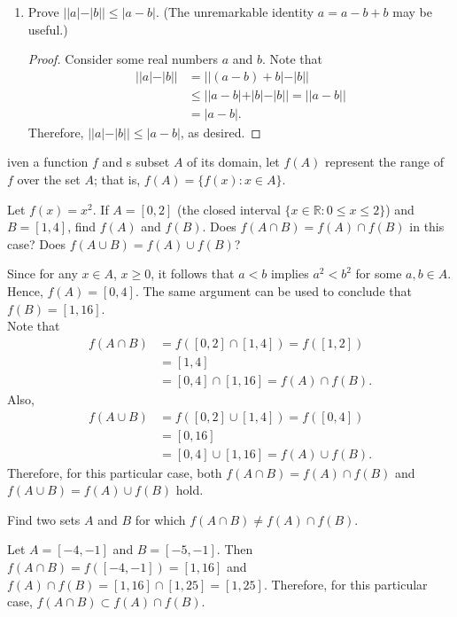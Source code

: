 \documentclass[12pt]{article}
\newcommand{\R}{\mathbb{R}}
\newenvironment{problem}[2][Problem]{\begin{trivlist}
		\item[\hskip \labelsep {\bfseries #1}\hskip \labelsep {\bfseries #2.}]}{\end{trivlist}}
\newenvironment{solution}[2][Solution]{\begin{trivlist}
		\item[\hskip \labelsep {\bfseries #1}\hskip \labelsep {\bfseries #2.}]}{\end{trivlist}}
\begin{document}
\begin{problem}{1.2.6}
\begin{enumerate}[label=(\alph*)]
			\item Prove $||a|-|b||\leq |a-b|$. (The unremarkable identity $a=a-b+b$ may be useful.)
			\begin{proof}
				Consider some real numbers $a$ and $b$. Note that
				\begin{align*}
					||a|-|b|| &= ||(a-b)+b|-|b||\\
					&\leq ||a-b|+|b|-|b|| = ||a-b||\\
					&= |a-b|.
				\end{align*}
			Therefore, $||a|-|b|| \leq |a-b|$, as desired. 
			\end{proof}
 		\end{enumerate}
	\end{problem}

	\begin{problem}
		Given a function $f$ and s subset $A$ of its domain, let $f(A)$ represent the range of $f$ over the set $A$; that is, $f(A) = \{f(x):x\in A\}$.
		\begin{enumerate}[label=(\alph*)]
			\item Let $f(x) = x^{2}$. If $A=[0,2]$ (the closed interval $\{x\in \R:0\leq x \leq 2\}$) and $B=[1,4]$, find $f(A)$ and $f(B)$. Does $f(A\cap B) = f(A) \cap f(B)$ in this case? Does $f(A\cup B) = f(A)\cup f(B)$?
			\begin{solution}{(a)}
				Since for any $x\in A$, $x\geq 0$, it follows that $a<b$ implies $a^{2}<b^{2}$ for some $a,b \in A$. Hence, $f(A) = [0,4]$. The same argument can be used to conclude that $f(B) = [1,16]$. \\
				
				Note that 
				\begin{align*}
					f(A\cap B) &= f([0,2]\cap [1,4]) = f([1,2])\\
					&= [1,4]\\
					&= [0,4]\cap [1,16] = f(A)\cap f(B).
				\end{align*}
			 Also,
			\begin{align*}
				f(A\cup B) &= f([0,2]\cup [1,4]) = f([0,4])\\
				&= [0,16]\\
				&= [0,4]\cup [1,16] = f(A)\cup f(B).
			\end{align*}
		Therefore, for this particular case, both $f(A\cap B) = f(A)\cap f(B)$ and $f(A\cup B) = f(A)\cup f(B)$ hold.
			\end{solution}
		
		\item Find two sets $A$ and $B$ for which $f(A\cap B) \neq f(A)\cap f(B)$.
		\begin{solution}{b}
			Let $A=[-4,-1]$ and $B=[-5,-1]$. Then $f(A\cap B) = f([-4,-1]) = [1,16]$ and $f(A)\cap f(B) = [1,16]\cap [1,25] = [1,25]$. Therefore, for this particular case, $f(A\cap B) \subset f(A)\cap f(B)$.
		\end{solution}
		

\end{enumerate}
\end{problem}
\end{document}
